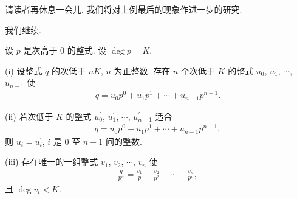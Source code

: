 请读者再休息一会儿. 我们将对上例最后的现象作进一步的研究.

\myLine

我们继续.

\begin{proposition}
    设 $p$ 是次高于 $0$ 的整式. 设 $\deg p = K$.

    (i) 设整式 $q$ 的次低于 $nK$, $n$ 为正整数. 存在 $n$ 个次低于 $K$ 的整式 $u_0$, $u_1$, $\cdots$, $u_{n-1}$ 使
    \begin{align*}
        q = u_0 p^0 + u_1 p^1 + \cdots + u_{n-1} p^{n-1}.
    \end{align*}

    (ii) 若次低于 $K$ 的整式 $u_0^{\prime}$, $u_1^{\prime}$, $\cdots$, $u_{n-1}^{\prime}$ 适合
    \begin{align*}
        q = u_0 p^0 + u_1 p^1 + \cdots + u_{n-1} p^{n-1},
    \end{align*}
    则 $u_i = u_i^{\prime}$, $i$ 是 $0$ 至 $n-1$ 间的整数.

    (iii) 存在唯一的一组整式 $v_1$, $v_2$, $\cdots$, $v_n$ 使
    \begin{align*}
        \frac{q}{p^n} = \frac{v_1}{p} + \frac{v_2}{p^2} + \cdots + \frac{v_n}{p^n},
    \end{align*}
    且 $\deg v_i < K$.
\end{proposition}

